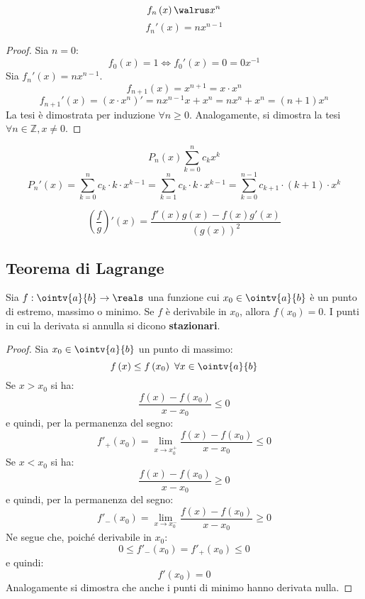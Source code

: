 \begin{lemma}
  $$f_n\left( x \right)\walrus x^n$$
  $$f_n'\left( x \right)=nx^{n-1}$$
\end{lemma}
\begin{proof}
  Sia $n=0$:
  $$f_0\left( x \right)=1\iff f_0'\left( x \right)=0=0x^{-1}$$
  Sia $f_n'\left( x \right)=nx^{n-1}$.
  $$f_{n+1}\left( x \right)=x^{n+1}=x\cdot x^n$$
  $$f_{n+1}'\left( x \right)=\left( x\cdot x^n \right)'=nx^{n-1}x+x^n=nx^n+x^n=\left( n+1 \right)x^n$$
  La tesi è dimostrata per induzione $\forall n\ge0$. Analogamente, si dimostra la tesi $\forall n\in\mathbb{Z},x\neq0$.
\end{proof}

\begin{lemma}
  $$P_n\left( x \right)\sum_{k=0}^nc_kx^k$$
  $$P_n'\left( x \right)=\sum_{k=0}^nc_k\cdot k\cdot x^{k-1}=\sum_{k=1}^nc_k\cdot k\cdot x^{k-1}=\sum_{k=0}^{n-1}c_{k+1}\cdot \left( k+1 \right)\cdot x^{k}$$
\end{lemma}

\begin{theorem}
  $$\left( \frac{f}{g} \right)'\left( x \right)=\frac{f'\left( x \right)g\left( x \right)-f\left( x \right)g'\left( x \right)}{\left( g\left( x \right) \right)^2}$$
\end{theorem}


\subsection{Teorema di Lagrange}

\begin{lemma}
  Sia $f:\ointv{a}{b}\to\reals$ una funzione cui $x_0\in\ointv{a}{b}$ è un punto di estremo, massimo o minimo. Se $f$ è derivabile in $x_0$, allora $f\left( x_0 \right)=0$. I punti in cui la derivata si annulla si dicono \textbf{stazionari}.
\end{lemma}
\begin{proof}
  Sia $x_0\in\ointv{a}{b}$ un punto di massimo:
  $$f\left( x \right)\le f\left( x_0 \right)\ \forall x\in\ointv{a}{b}$$
  Se $x>x_0$ si ha:
  $$\frac{f\left( x \right)-f\left( x_0 \right)}{x-x_0}\le0$$
  e quindi, per la permanenza del segno:
  $$f'_+\left( x_0 \right)=\lim_{x\to x_0^+}\frac{f\left( x \right)-f\left( x_0 \right)}{x-x_0}\le0$$
  Se $x<x_0$ si ha:
  $$\frac{f\left( x \right)-f\left( x_0 \right)}{x-x_0}\ge0$$
  e quindi, per la permanenza del segno:
  $$f'_-\left( x_0 \right)=\lim_{x\to x_0^-}\frac{f\left( x \right)-f\left( x_0 \right)}{x-x_0}\ge0$$
  Ne segue che, poiché derivabile in $x_0$:
  $$0\le f'_-\left( x_0 \right)=f'_+\left( x_0 \right)\le 0$$
  e quindi:
  $$f'\left( x_0 \right)=0$$
  Analogamente si dimostra che anche i punti di minimo hanno derivata nulla.
\end{proof}

